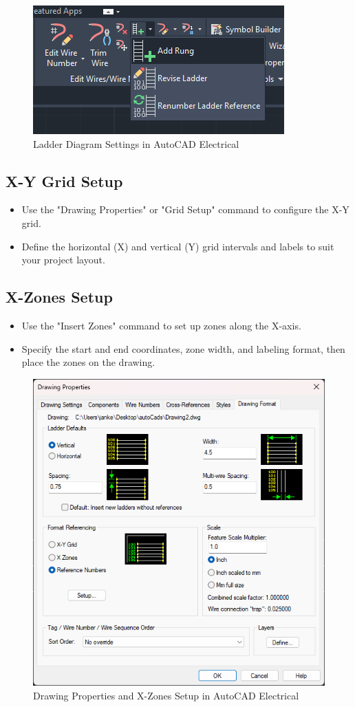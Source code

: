 \documentclass[12pt]{article}
\begin{document}
\begin{figure}[H]
    \centering
    \includegraphics[width=.5\textwidth]{rung.png}
    \caption{Ladder Diagram Settings in AutoCAD Electrical}
    \label{fig:ladder_settings}
\end{figure}

\subsection*{X-Y Grid Setup}
\begin{itemize}
    \item Use the "Drawing Properties" or "Grid Setup" command to configure the X-Y grid.
    \item Define the horizontal (X) and vertical (Y) grid intervals and labels to suit your project layout.
\end{itemize}

\subsection*{X-Zones Setup}
\begin{itemize}
    \item Use the "Insert Zones" command to set up zones along the X-axis.
    \item Specify the start and end coordinates, zone width, and labeling format, then place the zones on the drawing.
\end{itemize}

\begin{figure}[H]
    \centering
    \includegraphics[width=.5\textwidth]{drawp.png}
    \caption{Drawing Properties and X-Zones Setup in AutoCAD Electrical}
    \label{fig:zones}
\end{figure}
\end{document}
